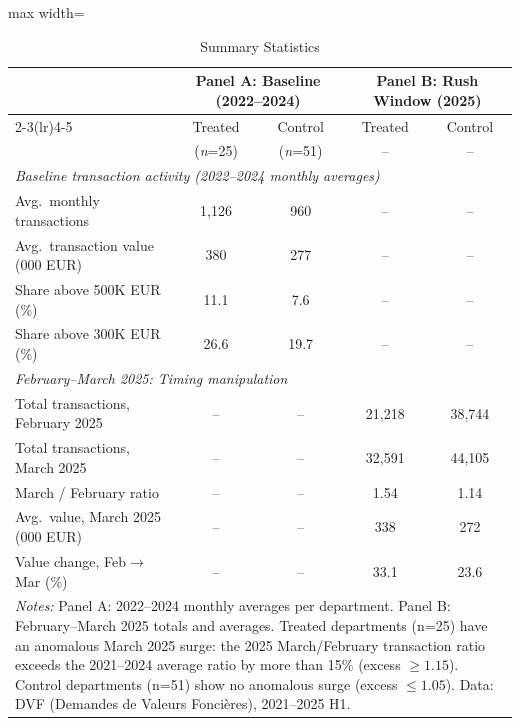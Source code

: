 
\begin{table}[htbp]
\centering
\caption{Summary Statistics}
\label{tab:summary}
\small
\begin{adjustbox}{max width=\textwidth}
\begin{tabular}{lcccc}
\hline\hline
 & \multicolumn{2}{c}{\textbf{Panel A: Baseline (2022--2024)}} & \multicolumn{2}{c}{\textbf{Panel B: Rush Window (2025)}} \\
\cmidrule(lr){2-3}\cmidrule(lr){4-5}
 & Treated & Control & Treated & Control \\
 & (\textit{n}=25) & (\textit{n}=51) & -- & -- \\
\hline
\multicolumn{5}{l}{\textit{Baseline transaction activity (2022--2024 monthly averages)}} \\
Avg.~monthly transactions & 1,126 & 960 & -- & -- \\
Avg.~transaction value (000 EUR) & 380 & 277 & -- & -- \\
Share above 500K EUR (\%) & 11.1 & 7.6 & -- & -- \\
Share above 300K EUR (\%) & 26.6 & 19.7 & -- & -- \\
\hline
\multicolumn{5}{l}{\textit{February--March 2025: Timing manipulation}} \\
Total transactions, February 2025 & -- & -- & 21,218 & 38,744 \\
Total transactions, March 2025 & -- & -- & 32,591 & 44,105 \\
March / February ratio & -- & -- & 1.54 & 1.14 \\
Avg.~value, March 2025 (000 EUR) & -- & -- & 338 & 272 \\
Value change, Feb$\to$Mar (\%) & -- & -- & 33.1 & 23.6 \\
\hline\hline
\multicolumn{5}{p{0.92\textwidth}}{\footnotesize \textit{Notes:}
Panel A: 2022--2024 monthly averages per department.
Panel B: February--March 2025 totals and averages.
Treated departments (n=25) have an anomalous March 2025 surge:
the 2025 March/February transaction ratio exceeds the 2021--2024 average
ratio by more than 15\% (excess $\geq 1.15$).
Control departments (n=51) show no anomalous surge (excess $\leq 1.05$).
Data: DVF (Demandes de Valeurs Fonci\`eres), 2021--2025 H1.}
\end{tabular}
\end{adjustbox}
\end{table}

